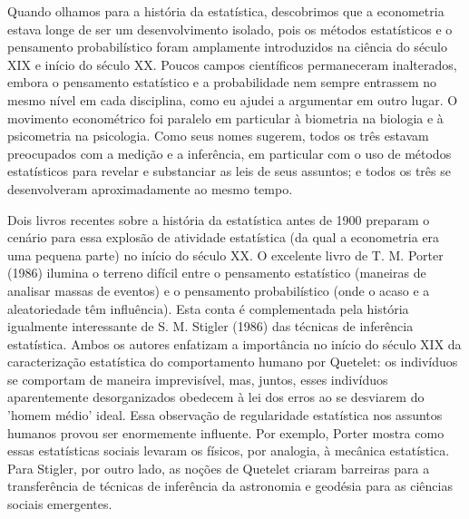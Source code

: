 \documentclass[12pt]{article}
\begin{document}
Quando olhamos para a história da estatística, descobrimos que a econometria estava longe de ser um desenvolvimento isolado, pois os métodos estatísticos e o pensamento probabilístico foram amplamente introduzidos na ciência do século XIX e início do século XX. Poucos campos científicos permaneceram inalterados, embora o pensamento estatístico e a probabilidade nem sempre entrassem no mesmo nível em cada disciplina, como eu ajudei a argumentar em outro lugar. O movimento econométrico foi paralelo em particular à biometria na biologia e à psicometria na psicologia. Como seus nomes sugerem, todos os três estavam preocupados com a medição e a inferência, em particular com o uso de métodos estatísticos para revelar e substanciar as leis de seus assuntos; e todos os três se desenvolveram aproximadamente ao mesmo tempo.

Dois livros recentes sobre a história da estatística antes de 1900 preparam o cenário para essa explosão de atividade estatística (da qual a econometria era uma pequena parte) no início do século XX. O excelente livro de T. M. Porter (1986) ilumina o terreno difícil entre o pensamento estatístico (maneiras de analisar massas de eventos) e o pensamento probabilístico (onde o acaso e a aleatoriedade têm influência). Esta conta é complementada pela história igualmente interessante de S. M. Stigler (1986) das técnicas de inferência estatística. Ambos os autores enfatizam a importância no início do século XIX da caracterização estatística do comportamento humano por Quetelet: os indivíduos se comportam de maneira imprevisível, mas, juntos, esses indivíduos aparentemente desorganizados obedecem à lei dos erros ao se desviarem do 'homem médio' ideal. Essa observação de regularidade estatística nos assuntos humanos provou ser enormemente influente. Por exemplo, Porter mostra como essas estatísticas sociais levaram os físicos, por analogia, à mecânica estatística. Para Stigler, por outro lado, as noções de Quetelet criaram barreiras para a transferência de técnicas de inferência da astronomia e geodésia para as ciências sociais emergentes.
\end{document}
